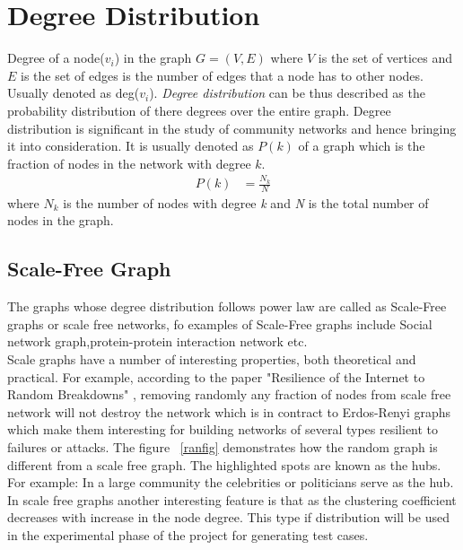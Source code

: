 \section{Degree Distribution}
Degree of a node($v_i$) in the graph $G = (V,E)$ where $V$ is the set of vertices and $E$ is the set of edges is the number of edges that a  node has to other nodes. Usually denoted as deg($v_i$). \textit{Degree distribution} can be thus described as the probability distribution of there degrees over the entire graph.  Degree distribution is significant in the study of community networks and hence bringing it into consideration.  It is usually denoted as $P(k)$ of a graph which is the fraction of nodes in the network with degree $k$.
\begin{equation}
\begin{split}
P(k) &= \frac{N_k}{N}
\end{split}
\end{equation}
where $N_k$ is the number of  nodes with degree \textit{k} and \textit{N} is the total number of nodes in the graph.
\subsection{Scale-Free Graph}
The graphs whose degree distribution follows power law are called as Scale-Free graphs or scale free networks, fo examples of Scale-Free graphs include Social network graph,protein-protein interaction network etc. \\
Scale graphs have a number of interesting properties, both theoretical and practical. For example, according to the paper  "Resilience of the Internet to Random Breakdowns" \cite{scalefree}, removing randomly any fraction of nodes from scale free network will not destroy the network which is in contract to Erdos-Renyi graphs which make them interesting for building networks of several types resilient to failures or attacks. The figure ~\ref{ranfig} demonstrates how the random graph is different from a scale free graph.  The highlighted spots are known as the hubs. For example: In a large community the celebrities or politicians serve as the hub. In scale free graphs another interesting feature is that as the clustering coefficient decreases with increase in the node degree. This type if distribution will be used in the experimental phase of the project for generating test cases. 


